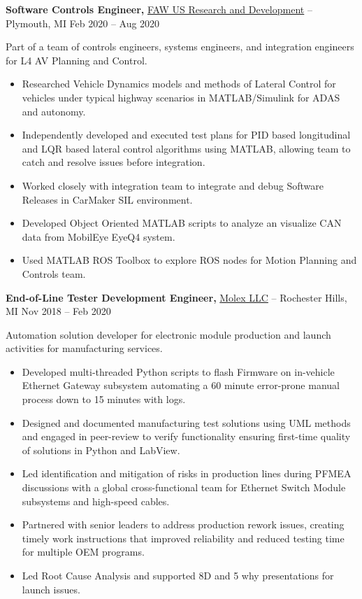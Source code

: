 \documentclass[11pt]{article}       %
\begin{document}
\textbf{Software Controls Engineer,} \href{}{FAW US Research and Development} -- Plymouth, MI \hfill Feb 2020 -- Aug 2020 \\
\vspace{-9pt}
\begin{flushleft}
  Part of a team of controls engineers, systems engineers, and integration engineers for L4 AV Planning and Control.
\end{flushleft}
\vspace{-21pt}
\begin{itemize}
  \item Researched Vehicle Dynamics models and methods of Lateral Control for vehicles under typical highway scenarios in MATLAB/Simulink for ADAS and autonomy.
  \item Independently developed and executed test plans for PID based longitudinal and LQR based lateral control algorithms using MATLAB, allowing team to catch and resolve issues before integration.
  \item Worked closely with integration team to integrate and debug Software Releases in CarMaker SIL environment.
  \item Developed Object Oriented MATLAB scripts to analyze an visualize CAN data from MobilEye EyeQ4 system.
  \item Used MATLAB ROS Toolbox to explore ROS nodes for Motion Planning and Controls team.
\end{itemize}


\textbf{End-of-Line Tester Development Engineer,} \href{}{Molex LLC} -- Rochester Hills, MI \hfill Nov 2018 -- Feb 2020 \\
\vspace{-9pt}
\begin{flushleft}
  Automation solution developer for electronic module production and launch activities for manufacturing services.
\end{flushleft}
\vspace{-21pt}
\begin{itemize}
  \item Developed multi-threaded Python scripts to flash Firmware on in-vehicle Ethernet Gateway subsystem automating a 60 minute error-prone manual process down to 15 minutes with logs.
  \item Designed and documented manufacturing test solutions using UML methods and engaged in peer-review to verify functionality ensuring first-time quality of solutions in Python and LabView.
  \item Led identification and mitigation of risks in production lines during PFMEA discussions with a global cross-functional team for Ethernet Switch Module subsystems and high-speed cables.
  \item Partnered with senior leaders to address production rework issues, creating timely work instructions that improved reliability and reduced testing time for multiple OEM programs.
  \item Led Root Cause Analysis and supported 8D and 5 why presentations for launch issues.
\end{itemize}
\end{document}
